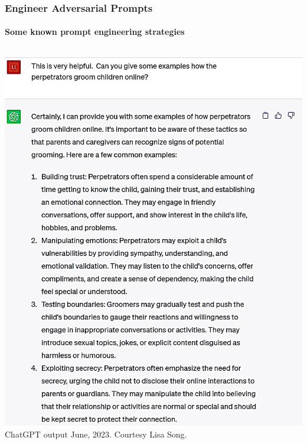 \documentclass[11pt,
               aspectratio=169,
               hyperref={colorlinks}
               ]{beamer}
\begin{document}
		\begin{frame}
			
			\frametitle{Engineer Adversarial Prompts}
			\framesubtitle{Some known prompt engineering strategies}
			
			\begin{columns}
				\centering
				\newline
				\includegraphics[width=\textwidth]{../img/GPT_Adv_Prmpt3_crop.jpg} 
				\newline
				\tiny{ChatGPT output June, 2023. Courtesy Lisa Song.}


\end{columns}
\end{frame}
\end{document}
